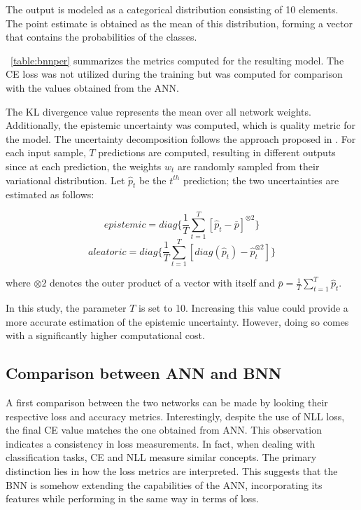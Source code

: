 The output is modeled as a categorical distribution consisting of 10 elements. The point estimate is obtained as the mean of this distribution, forming a vector that contains the probabilities of the classes.

\Tab~\ref{table:bnnper} summarizes the metrics computed for the resulting model. The CE loss was not utilized during the training but was computed for comparison with the values obtained from the ANN.

The KL divergence value represents the mean over all network weights. Additionally, the epistemic uncertainty was computed, which is quality metric for the model. The uncertainty decomposition follows the approach proposed in \cite{KWON2020106816}. For each input sample, $T$ predictions are computed, resulting in different outputs since at each prediction, the weights $w_t$ are randomly sampled from their variational distribution. Let $\hat{p}_t$ be the $t^{th}$ prediction; the two uncertainties are estimated as follows:

\begin{equation}
	epistemic = diag\{\frac{1}{T} \sum_{t=1}^{T} [\hat{p}_t - \bar{p}]^{\otimes 2}\}
\end{equation}
\begin{equation}
	aleatoric = diag\{\frac{1}{T} \sum_{t=1}^{T} [diag(\hat{p}_t) - \hat{p}_t^{\otimes 2}]\}
\end{equation}

where $\otimes 2$ denotes the outer product of a vector with itself and $\bar{p} = \frac{1}{T} \sum_{t=1}^{T} \hat{p}_t$.

In this study, the parameter $T$ is set to 10. Increasing this value could provide a more accurate estimation of the epistemic uncertainty. However, doing so comes with a significantly higher computational cost.

\subsection{Comparison between ANN and BNN}

A first comparison between the two networks can be made by looking their respective loss and accuracy metrics. Interestingly, despite the use of NLL loss, the final CE value matches the one obtained from ANN. This observation indicates a consistency in loss measurements. In fact, when dealing with classification tasks, CE and NLL measure similar concepts. The primary distinction lies in how the loss metrics are interpreted. This suggests that the BNN is somehow extending the capabilities of the ANN, incorporating its features while performing in the same way in terms of loss.

